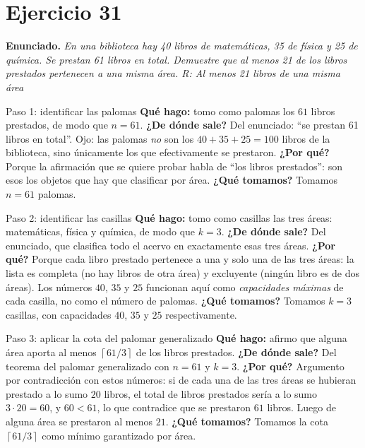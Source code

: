 \documentclass[11pt]{article}
\begin{document}
\section*{Ejercicio 31}

\textbf{Enunciado.} \emph{En una biblioteca hay 40 libros de matem\'aticas, 35 de f\'isica y 25 de qu\'imica. Se prestan 61 libros en total. Demuestre que al menos 21 de los libros prestados pertenecen a una misma \'area. R: Al menos 21 libros de una misma \'area}

\begin{sol}

\begin{paso}{Paso 1: identificar las palomas}
\textbf{Qu\'e hago:} tomo como palomas los $61$ libros prestados, de modo que $n=61$.
\textbf{¿De d\'onde sale?} Del enunciado: ``se prestan 61 libros en total''. Ojo: las palomas \emph{no} son los $40+35+25=100$ libros de la biblioteca, sino \'unicamente los que efectivamente se prestaron.
\textbf{¿Por qu\'e?} Porque la afirmaci\'on que se quiere probar habla de ``los libros prestados'': son esos los objetos que hay que clasificar por \'area.
\textbf{¿Qu\'e tomamos?} Tomamos $n=61$ palomas.
\end{paso}

\begin{paso}{Paso 2: identificar las casillas}
\textbf{Qu\'e hago:} tomo como casillas las tres \'areas: matem\'aticas, f\'isica y qu\'imica, de modo que $k=3$.
\textbf{¿De d\'onde sale?} Del enunciado, que clasifica todo el acervo en exactamente esas tres \'areas.
\textbf{¿Por qu\'e?} Porque cada libro prestado pertenece a una y solo una de las tres \'areas: la lista es completa (no hay libros de otra \'area) y excluyente (ning\'un libro es de dos \'areas). Los n\'umeros $40$, $35$ y $25$ funcionan aqu\'i como \emph{capacidades m\'aximas} de cada casilla, no como el n\'umero de palomas.
\textbf{¿Qu\'e tomamos?} Tomamos $k=3$ casillas, con capacidades $40$, $35$ y $25$ respectivamente.
\end{paso}

\begin{paso}{Paso 3: aplicar la cota del palomar generalizado}
\textbf{Qu\'e hago:} afirmo que alguna \'area aporta al menos $\left\lceil 61/3\right\rceil$ de los libros prestados.
\textbf{¿De d\'onde sale?} Del teorema del palomar generalizado con $n=61$ y $k=3$.
\textbf{¿Por qu\'e?} Argumento por contradicci\'on con estos n\'umeros: si de cada una de las tres \'areas se hubieran prestado a lo sumo $20$ libros, el total de libros prestados ser\'ia a lo sumo $3\cdot 20 = 60$, y $60<61$, lo que contradice que se prestaron $61$ libros. Luego de alguna \'area se prestaron al menos $21$.
\textbf{¿Qu\'e tomamos?} Tomamos la cota $\left\lceil 61/3\right\rceil$ como m\'inimo garantizado por \'area.
\end{paso}


\end{sol}
\end{document}
